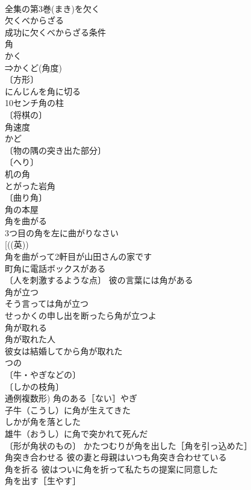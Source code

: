 \documentclass[8pt]{extreport}
\begin{document}
\begin{CJK}{UTF8}{min}
\\	全集の第3巻(まき)を欠く 
\\	欠くべからざる　
\\	成功に欠くべからざる条件 
\\	角	
\\	かく 
\\	⇒かくど(角度)
\\	〔方形〕
\\	にんじんを角に切る 
\\	10センチ角の柱 
\\	〔将棋の〕
\\	角速度 
\\	かど 
\\	〔物の隅の突き出た部分〕
\\	〔へり〕
\\	机の角 
\\	とがった岩角 
\\	〔曲り角〕
\\	角の本屋 
\\	角を曲がる 
\\	3つ目の角を左に曲がりなさい 
\\	[((英)) 
\\	角を曲がって2軒目が山田さんの家です 
\\	町角に電話ボックスがある 
\\	〔人を刺激するような点〕 彼の言葉には角がある 
\\	角が立つ　
\\	そう言っては角が立つ 
\\	せっかくの申し出を断ったら角が立つよ 
\\	角が取れる　
\\	角が取れた人 
\\	彼女は結婚してから角が取れた 
\\	つの 
\\	〔牛・やぎなどの〕
\\	〔しかの枝角〕
\\	通例複数形) 角のある［ない］やぎ 
\\	子牛（こうし）に角が生えてきた 
\\	しかが角を落とした 
\\	雄牛（おうし）に角で突かれて死んだ 
\\	〔形が角状のもの〕 かたつむりが角を出した［角を引っ込めた］ 
\\	角突き合わせる 彼の妻と母親はいつも角突き合わせている 
\\	角を折る 彼はついに角を折って私たちの提案に同意した 
\\	角を出す［生やす］　

\end{CJK}
\end{document}
